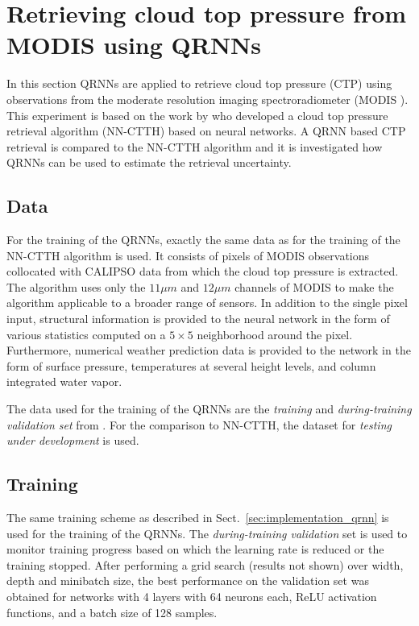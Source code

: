 \documentclass[journal abbreviation, manuscript]{copernicus}
\begin{document}
\section{Retrieving cloud top pressure from MODIS using QRNNs}
\label{sec:ctp}

In this section QRNNs are applied to retrieve cloud top pressure (CTP) using
observations from the moderate resolution imaging spectroradiometer (MODIS 
\citep{modis}). This experiment is based on the work by \cite{hakansson} who
developed a cloud top pressure retrieval algorithm (NN-CTTH) based on neural
networks. A QRNN based CTP retrieval is compared to the NN-CTTH algorithm and it
is investigated how QRNNs can be used to estimate the retrieval uncertainty.

\subsection{Data}

For the training of the QRNNs, exactly the same data as for the training of the
NN-CTTH algorithm is used. It consists of pixels of MODIS observations
collocated with CALIPSO \citep{calipso} data from which the cloud top pressure
is extracted. The algorithm uses only the $11 \unit{\mu m}$ and $12\unit{\mu m}$
channels of MODIS to make the algorithm applicable to a broader range of
sensors. In addition to the single pixel input, structural information is
provided to the neural network in the form of various statistics computed on a
$5 \times 5$ neighborhood around the pixel. Furthermore, numerical weather
prediction data is provided to the network in the form of surface pressure,
temperatures at several height levels, and column integrated water
vapor.

The data used for the training of the QRNNs are the \textit{training} and
\textit{during-training validation set} from \cite{hakansson}. For the
comparison to NN-CTTH, the dataset for \textit{testing under development} is
used.

\subsection{Training}

The same training scheme as described in Sect.~\ref{sec:implementation_qrnn}
is used for the training of the QRNNs. The \textit{during-training validation} set is used
to monitor training progress based on which the learning rate is reduced or the
training stopped. After performing a grid search (results not shown) over width,
depth and minibatch size, the best performance on the validation set was
obtained for networks with 4 layers with 64 neurons each, ReLU activation functions,
 and a batch size of 128 samples.
\end{document}
